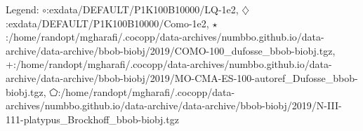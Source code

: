 Legend: {\color{CornflowerBlue}$\circ$}:exdata/DEFAULT/P1K100B10000/LQ-1e2, {\color{Orange}$\diamondsuit$}:exdata/DEFAULT/P1K100B10000/Como-1e2, {\color{Green}$\star$}:/home/randopt/mgharafi/.cocopp/data-archives/numbbo.github.io/data-archive/data-archive/bbob-biobj/2019/COMO-100\_dufosse\_bbob-biobj.tgz, {\color{red}+}:/home/randopt/mgharafi/.cocopp/data-archives/numbbo.github.io/data-archive/data-archive/bbob-biobj/2019/MO-CMA-ES-100-autoref\_Dufosse\_bbob-biobj.tgz, {\color{magenta}$\pentagon$}:/home/randopt/mgharafi/.cocopp/data-archives/numbbo.github.io/data-archive/data-archive/bbob-biobj/2019/N-III-111-platypus\_Brockhoff\_bbob-biobj.tgz